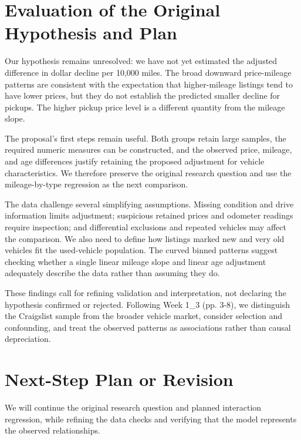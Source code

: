 \documentclass[10pt,letterpaper]{article}
\begin{document}
\section{Evaluation of the Original Hypothesis and Plan}

Our hypothesis remains unresolved: we have not yet estimated the adjusted difference in dollar decline per 10,000 miles. The broad downward price-mileage patterns are consistent with the expectation that higher-mileage listings tend to have lower prices, but they do not establish the predicted smaller decline for pickups. The higher pickup price level is a different quantity from the mileage slope.


The proposal's first steps remain useful. Both groups retain large samples, the required numeric measures can be constructed, and the observed price, mileage, and age differences justify retaining the proposed adjustment for vehicle characteristics. We therefore preserve the original research question and use the mileage-by-type regression as the next comparison.


The data challenge several simplifying assumptions. Missing condition and drive information limits adjustment; suspicious retained prices and odometer readings require inspection; and differential exclusions and repeated vehicles may affect the comparison. We also need to define how listings marked new and very old vehicles fit the used-vehicle population. The curved binned patterns suggest checking whether a single linear mileage slope and linear age adjustment adequately describe the data rather than assuming they do.


These findings call for refining validation and interpretation, not declaring the hypothesis confirmed or rejected. Following Week 1\_3 (pp. 3-8), we distinguish the Craigslist sample from the broader vehicle market, consider selection and confounding, and treat the observed patterns as associations rather than causal depreciation.


\section{Next-Step Plan or Revision}

We will continue the original research question and planned interaction regression, while refining the data checks and verifying that the model represents the observed relationships.
\end{document}
